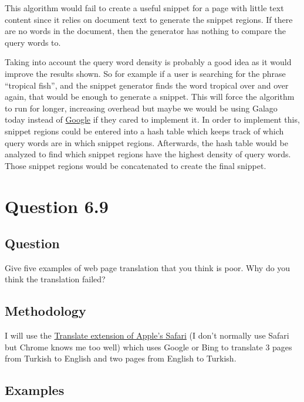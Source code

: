 \documentclass[10pt,letterpaper,bibliography=totoc]{scrartcl}
\begin{document}
This algorithm would fail to create a useful snippet for a page with little text content since it relies on document text to generate the snippet regions. If there are no words in the document, then the generator has nothing to compare the query words to.

Taking into account the query word density is probably a good idea as it would improve the results shown. So for example if a user is searching for the phrase ``tropical fish'', and the snippet generator finds the word tropical over and over again, that would be enough to generate a snippet. This will force the algorithm to run for longer, increasing overhead but maybe we would be using Galago today instead of \href{www.google.com}{Google} if they cared to implement it. In order to implement this, snippet regions could be entered into a hash table which keeps track of which query words are in which snippet regions. Afterwards, the hash table would be analyzed to find which snippet regions have the highest density of query words. Those snippet regions would be concatenated to create the final snippet.

\section{Question 6.9}
\subsection {Question}
Give five examples of web page translation that you think is poor. Why do you think the translation failed?

\subsection{Methodology}
I will use the \href{https://safari-extensions.apple.com/details/?id=com.sidetree.Translate-S64NDGV2C5}{Translate extension of Apple's Safari} (I don't normally use Safari but Chrome knows me too well) which uses Google or Bing to translate 3 pages from Turkish to English and two pages from English to Turkish. 

\subsection{Examples}
\end{document}
